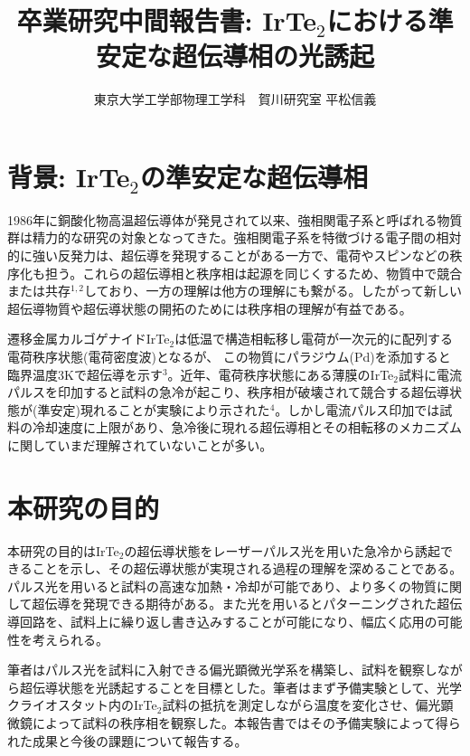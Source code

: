 \documentclass[11pt,a4paper]{jsarticle}
\title{\vspace{-1.5zh}卒業研究中間報告書: IrTe$_2$における準安定な超伝導相の光誘起}
\author{\vspace{-2zh}東京大学工学部物理工学科　賀川研究室 平松信義}
\date{}
\begin{document}
\maketitle
\thispagestyle{mypagestyle}

\vspace{-2zh}
\section{背景: IrTe$_2$の準安定な超伝導相}
1986年に銅酸化物高温超伝導体が発見されて以来、強相関電子系と呼ばれる物質群は精力的な研究の対象となってきた。強相関電子系を特徴づける電子間の相対的に強い反発力は、超伝導を発現することがある一方で、電荷やスピンなどの秩序化も担う。これらの超伝導相と秩序相は起源を同じくするため、物質中で競合または共存$^{1,2}$しており、一方の理解は他方の理解にも繋がる。したがって新しい超伝導物質や超伝導状態の開拓のためには秩序相の理解が有益である。

遷移金属カルゴゲナイドIrTe$_2$は低温で構造相転移し電荷が一次元的に配列する電荷秩序状態(電荷密度波)となるが、
この物質にパラジウム(Pd)を添加すると臨界温度3Kで超伝導を示す$^3$。近年、電荷秩序状態にある薄膜のIrTe$_2$試料に電流パルスを印加すると試料の急冷が起こり、秩序相が破壊されて競合する超伝導状態が(準安定)現れることが実験により示された$^4$。しかし電流パルス印加では試料の冷却速度に上限があり、急冷後に現れる超伝導相とその相転移のメカニズムに関していまだ理解されていないことが多い。

\section{本研究の目的}
本研究の目的はIrTe$_2$の超伝導状態をレーザーパルス光を用いた急冷から誘起できることを示し、その超伝導状態が実現される過程の理解を深めることである。パルス光を用いると試料の高速な加熱・冷却が可能であり、より多くの物質に関して超伝導を発現できる期待がある。また光を用いるとパターニングされた超伝導回路を、試料上に繰り返し書き込みすることが可能になり、幅広く応用の可能性を考えられる。

筆者はパルス光を試料に入射できる偏光顕微光学系を構築し、試料を観察しながら超伝導状態を光誘起することを目標とした。筆者はまず予備実験として、光学クライオスタット内のIrTe$_2$試料の抵抗を測定しながら温度を変化させ、偏光顕微鏡によって試料の秩序相を観察した。本報告書ではその予備実験によって得られた成果と今後の課題について報告する。
\end{document}
